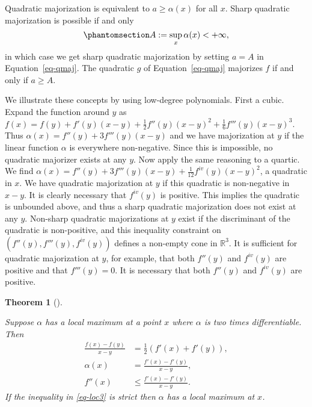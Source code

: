 \documentclass[
  12pt,
  letterpaper,
  DIV=11,
  numbers=noendperiod]{scrartcl}
\theoremstyle{definition}
\theoremstyle{plain}
\newtheorem{theorem}{Theorem}[section]
\theoremstyle{plain}
\theoremstyle{remark}
\begin{document}
Quadratic majorization is equivalent to \(a\geq\alpha(x)\) for all
\(x\). Sharp quadratic majorization is possible if and only
\begin{equation}\phantomsection\label{eq-Adef}{
A:=\sup_x\alpha(x)<+\infty,
}\end{equation} in which case we get sharp quadratic majorization by
setting \(a=A\) in Equation~\ref{eq-qmaj}. The quadratic \(g\) of
Equation~\ref{eq-qmaj} majorizes \(f\) if and only if \(a\geq A\).

We illustrate these concepts by using low-degree polynomials. First a
cubic. Expand the function around \(y\) as
\(f(x)=f(y)+f'(y)(x-y)+\frac12f''(y)(x-y)^2+\frac16f'''(y)(x-y)^3\).
Thus \(\alpha(x)=f''(y)+3f'''(y)(x-y)\) and we have majorization at
\(y\) if the linear function \(\alpha\) is everywhere non-negative.
Since this is impossible, no quadratic majorizer exists at any \(y\).
Now apply the same reasoning to a quartic. We find
\(\alpha(x)=f''(y)+3f'''(y)(x-y)+\frac{1}{12}f^{iv}(y)(x-y)^2\), a
quadratic in \(x\). We have quadratic majorization at \(y\) if this
quadratic is non-negative in \(x-y\). It is clearly necessary that
\(f^{iv}(y)\) is positive. This implies the quadratic is unbounded
above, and thus a sharp quadratic majorization does not exist at any
\(y\). Non-sharp quadratic majorizations at \(y\) exist if the
discriminant of the quadratic is non-positive, and this inequality
constraint on \((f''(y),f'''(y),f^{iv}(y))\) defines a non-empty cone in
\(\mathbb{R}^3\). It is sufficient for quadratic majorization at \(y\),
for example, that both \(f''(y)\) and \(f^{iv}(y)\) are positive and
that \(f'''(y)=0\). It is necessary that both \(f''(y)\) and
\(f^{iv}(y)\) are positive.

\begin{theorem}[]\protect\hypertarget{thm-locmax}{}\label{thm-locmax}

Suppose \(\alpha\) has a local maximum at a point \(x\) where \(\alpha\)
is two times differentiable. Then \begin{subequations}
\begin{align}
\frac{f(x)-f(y)}{x-y}&=\frac12(f'(x)+f'(y)),\label{eq-loc1}\\
\alpha(x)&=\frac{f'(x)-f'(y)}{x-y},\label{eq-loc2}\\
f''(x)&\leq\frac{f'(x)-f'(y)}{x-y}.\label{eq-loc3}
\end{align}
\end{subequations} If the inequality in \eqref{eq-loc3} is strict then
\(\alpha\) has a local maximum at \(x\).

\end{theorem}
\end{document}
